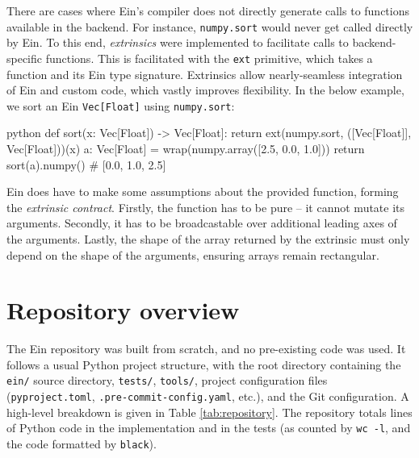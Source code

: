 There are cases where Ein's compiler does not directly generate calls to functions available in the backend. For instance, \texttt{numpy.sort} would never get called directly by Ein. To this end, \textit{extrinsics} were implemented to facilitate calls to backend-specific functions. This is facilitated with the \texttt{ext} primitive, which takes a function and its Ein type signature. Extrinsics allow nearly-seamless integration of Ein and custom code, which vastly improves flexibility. In the below example, we sort an Ein \texttt{Vec[Float]} using \texttt{numpy.sort}:
\begin{center}
\begin{cminted}{python}    
def sort(x: Vec[Float]) -> Vec[Float]:
    return ext(numpy.sort, ([Vec[Float]], Vec[Float]))(x)
a: Vec[Float] = wrap(numpy.array([2.5, 0.0, 1.0]))
return sort(a).numpy()  # [0.0, 1.0, 2.5]
\end{cminted}
\end{center}

Ein does have to make some assumptions about the provided function, forming the \textit{extrinsic contract}. Firstly, the function has to be pure -- it cannot mutate its arguments. Secondly, it has to be broadcastable over additional leading axes of the arguments. Lastly, the shape of the array returned by the extrinsic must only depend on the shape of the arguments, ensuring arrays remain rectangular. 

\needspace{4em}
\section{Repository overview}
\label{repository-overview}

The Ein repository was built from scratch, and no pre-existing code was used.
It follows a usual Python project structure, with the root directory containing the \texttt{ein/} source directory, \texttt{tests/}, \texttt{tools/}, project configuration files (\texttt{pyproject.toml}, \texttt{.pre-commit-config.yaml}, etc.), and the Git configuration. 
A high-level breakdown is given in Table \ref{tab:repository}. The repository totals \todohere{} lines of Python code in the implementation and \todohere{} in the tests (as counted by \texttt{wc -l}, and the code formatted by \texttt{black}).

